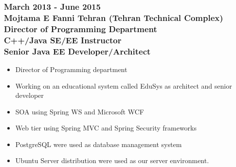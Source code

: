 \documentclass[10pt,a4paper]{article}
\begin{document}
\subsubsection{\textnormal {March 2013 - June 2015} \\ \textnormal {Mojtama E Fanni Tehran (Tehran Technical Complex)} \\ Director of Programming Department \\ C++/Java SE/EE Instructor \\ Senior Java EE Developer/Architect}
  \setlength{\leftskip}{0.5cm}
  \setlength{\rightskip}{1cm}
  \begin{itemize}
    \setlength{\rightskip}{2cm}
    \setlength\itemsep{0em}
    \item \small Director of Programming department
    \item \small Working on an educational system called EduSys as architect and senior developer
    \item \small SOA using Spring WS and Microsoft WCF
    \item \small Web tier using Spring MVC and Spring Security frameworks
    \item \small PostgreSQL were used as database management system
    \item \small Ubuntu Server distribution were used as our server environment.
  \end{itemize}
  \setlength{\leftskip}{0pt}
  \setlength{\rightskip}{0cm}
	  
\end{document}
